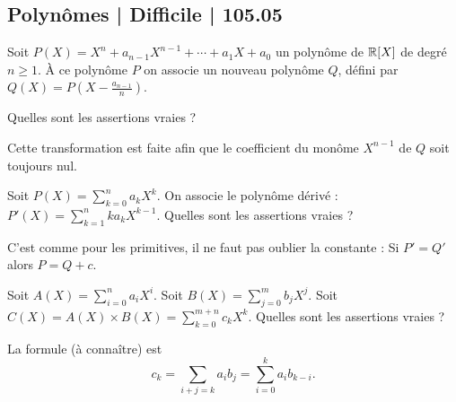 \subsection{Polynômes | Difficile | 105.05}


\begin{question}
Soit $P(X) = X^n + a_{n-1}X^{n-1} + \cdots + a_1X+a_0$ un polynôme de $\mathbb{R}[X]$ de degré $n \ge 1$. À ce polynôme $P$ on associe un nouveau polynôme $Q$, défini par $Q(X) = P(X - \frac{a_{n-1}}{n})$.

Quelles sont les assertions vraies ?
\begin{answers}



\end{answers}
\begin{explanations}
Cette transformation est faite afin que le coefficient du monôme $X^{n-1}$ de $Q$ soit toujours nul.
\end{explanations}
\end{question}


\begin{question}
Soit $P(X) = \sum_{k=0}^n a_k X^k$. On associe le polynôme dérivé :
$P'(X) = \sum_{k=1}^n ka_k X^{k-1}$. Quelles sont les assertions vraies ?
\begin{answers}



\end{answers}
\begin{explanations}
C'est comme pour les primitives, il ne faut pas oublier la constante :
Si $P'=Q'$ alors $P=Q +c$.
\end{explanations}
\end{question}



\begin{question}
Soit $A(X) = \sum_{i=0}^n a_i X^i$.
Soit $B(X) = \sum_{j=0}^m b_j X^j$.
Soit $C(X) = A(X) \times B(X) = \sum_{k=0}^{m+n} c_k X^k$.
Quelles sont les assertions vraies ?
\begin{answers}


    
\end{answers}
\begin{explanations}
La formule (à connaître) est 
$$c_k = \sum_{i+j=k} a_ib_j = \sum_{i=0}^k a_ib_{k-i}.$$
\end{explanations}
\end{question}


